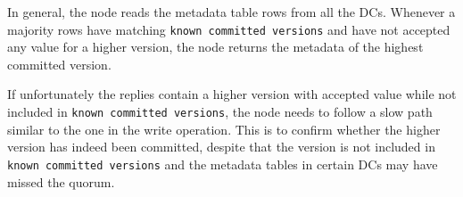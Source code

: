 In general, the \name node reads the metadata table rows from all the DCs.
Whenever a majority rows have matching {\tt known committed versions}
and have not accepted any value for a higher version, 
the \name node returns the metadata of the highest committed version.

If unfortunately the replies contain a higher version with accepted value while not included in {\tt known committed versions},
the \name node needs to follow a slow path similar to the one in the write operation.
This is to confirm whether the higher version has indeed been committed,
despite that the version is not included in {\tt known committed versions} and the metadata tables in certain DCs may have missed the quorum.



